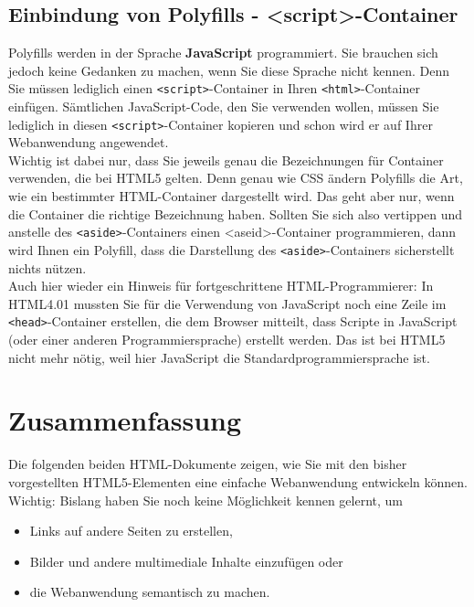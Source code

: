 \subsection{Einbindung von Polyfills - <script>-Container}

Polyfills werden in der Sprache \textbf{JavaScript} programmiert. Sie brauchen sich jedoch keine Gedanken zu machen, wenn Sie diese Sprache nicht kennen. Denn Sie müssen lediglich einen \verb|<script>|-Container in Ihren \verb|<html>|-Container einfügen. Sämtlichen JavaScript-Code, den Sie verwenden wollen, müssen Sie lediglich in diesen \verb|<script>|-Container kopieren und schon wird er auf Ihrer Webanwendung angewendet.\\

Wichtig ist dabei nur, dass Sie jeweils genau die Bezeichnungen für Container verwenden, die bei HTML5 gelten. Denn genau wie CSS ändern Polyfills die Art, wie ein bestimmter HTML-Container dargestellt wird. Das geht aber nur, wenn die Container die richtige Bezeichnung haben. Sollten Sie sich also vertippen und anstelle des \verb|<aside>|-Containers einen <aseid>-Container programmieren, dann wird Ihnen ein Polyfill, dass die Darstellung des \verb|<aside>|-Containers sicherstellt nichts nützen.\\

Auch hier wieder ein Hinweis für fortgeschrittene HTML-Programmierer: In HTML4.01 mussten Sie für die Verwendung von JavaScript noch eine Zeile im \verb|<head>|-Container erstellen, die dem Browser mitteilt, dass \glqq{}Scripte\grqq{} in JavaScript (oder einer anderen Programmiersprache) erstellt werden. Das ist bei HTML5 nicht mehr nötig, weil hier JavaScript die Standardprogrammiersprache ist.

\section{Zusammenfassung}

Die folgenden beiden HTML-Dokumente zeigen, wie Sie mit den bisher vorgestellten HTML5-Elementen eine einfache Webanwendung entwickeln können. Wichtig: Bislang haben Sie noch keine Möglichkeit kennen gelernt, um

\begin{itemize}
	\item Links auf andere Seiten zu erstellen,
	\item Bilder und andere multimediale Inhalte einzufügen oder
	\item die Webanwendung semantisch zu machen.
\end{itemize}

